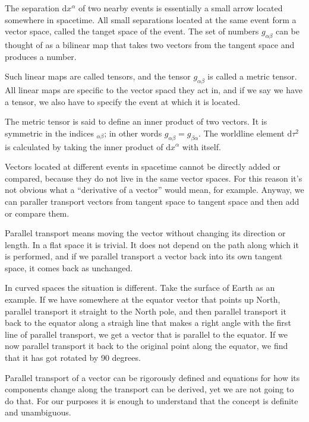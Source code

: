 \documentclass[11pt,oneside%
]{memoir}
\newcommand{\dd}{\mathrm{d}}
\begin{document}
The separation \(\dd x^\alpha\) of two nearby events is essentially a small arrow located somewhere in spacetime. All small separations located at the same event form a vector space, called the tanget space of the event. The set of numbers \(g_{\alpha\beta}\) can be thought of as a bilinear map that takes two vectors from the tangent space and produces a number.

Such linear maps are called tensors, and the tensor \(g_{\alpha\beta}\) is called a metric tensor. All linear maps are specific to the vector spacd they act in, and if we say we have a tensor, we also have to specify the event at which it is located.

The metric tensor is said to define an inner product of two vectors. It is symmetric in the indices \(_{\alpha\beta}\); in other words \(g_{\alpha\beta}=g_{\beta\alpha}\). The worldline element \(\dd\tau^2\) is calculated by taking the inner product of \(\dd x^\alpha\) with itself.

Vectors located at different events in spacetime cannot be directly added or compared, because they do not live in the same vector spaces. For this reason it's not obvious what a ``derivative of a vector'' would mean, for example. Anyway, we can paraller transport vectors from tangent space to tangent space and then add or compare them.

Parallel transport means moving the vector without changing its direction or length. In a flat space it is trivial. It does not depend on the path along which it is performed, and if we parallel transport a vector back into its own tangent space, it comes back as unchanged.

In curved spaces the situation is different. Take the surface of Earth as an example. If we have somewhere at the equator vector that points up North, parallel transport it straight to the North pole, and then parallel transport it back to the equator along a straigh line that makes a right angle with the first line of parallel transport, we get a vector that is parallel to the equator. If we now parallel transport it back to the original point along the equator, we find that it has got rotated by 90 degrees.

Parallel transport of a vector can be rigorously defined and equations for how its components change along the transport can be derived, yet we are not going to do that. For our purposes it is enough to understand that the concept is definite and unambiguous.
\end{document}
